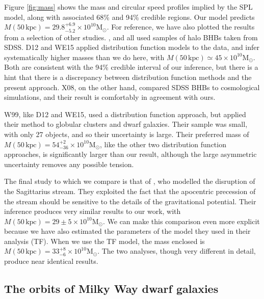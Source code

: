 \documentclass[useAMS,twocolumn,usenatbib]{mn2e}
\def\kpc{{\,\mathrm{kpc}}}
\begin{document}
Figure \ref{fig:mass} shows the mass and circular speed profiles implied by the SPL model, along with associated 68\% and 94\% credible regions. 
Our model predicts $M(50\kpc)=29.8^{+6.9}_{-5.2} \times 10^{10}\mathrm{M}_\odot$. 
For reference, we have also plotted the results from a selection of other studies. 
\citet[][X08]{Xu08}, \citet[][D12]{De12} and \citet[][WE15]{Wi15} all used samples of halo BHBs taken from SDSS. 
D12 and WE15 applied distribution function models to the data, and infer systematically higher masses than we do here, with $M(50\kpc) \simeq 45\times10^{10}\mathrm{M}_\odot$.  
Both are consistent with the 94\% credible interval of our inference, but there is a hint that there is a discrepancy between distribution function methods and the present approach.
X08, on the other hand, compared SDSS BHBs to cosmological simulations, and their result is comfortably in agreement with ours.

W99, like D12 and WE15, used a distribution function approach, but applied their method to globular clusters and dwarf galaxies. 
Their sample was small, with only 27 objects, and so their uncertainty is large. 
Their preferred mass of $M(50\kpc)=54^{+2}_{-36}\times 10^{10}\mathrm{M}_\odot$, like the other two distribution function approaches, is significantly larger than our result, although the large asymmetric uncertainty removes any possible tension.

The final study to which we compare is that of \citet[][G14]{Gi14}, who modelled the disruption of the Sagittarius stream. 
They exploited the fact that the apocentric precession of the stream should be sensitive to the details of the gravitational potential. 
Their inference produces very similar results to our work, with $M(50\kpc)=29\pm5\times 10^{10}\mathrm{M}_\odot$. 
We can make this comparison even more explicit because we have also estimated the parameters of the model they used in their analysis (TF). 
When we use the TF model, the mass enclosed is $M(50\kpc)=33^{+8}_{-6}\times 10^{10}\mathrm{M}_\odot$. 
The two analyses, though very different in detail, produce near identical results.

\subsection{The orbits of Milky Way dwarf galaxies}
\end{document}
